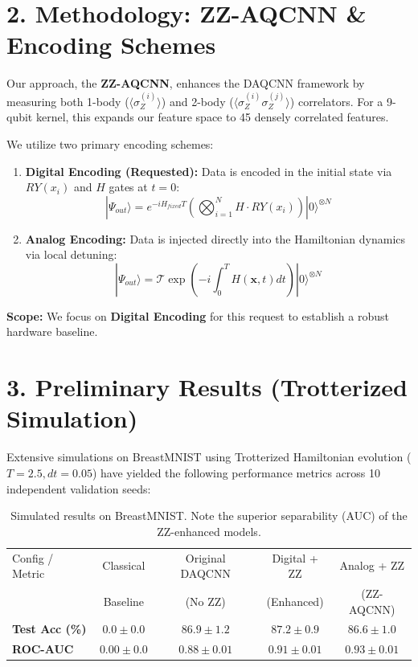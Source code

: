 \documentclass[11pt,a4paper]{article}
\begin{document}
\section*{2. Methodology: ZZ-AQCNN \& Encoding Schemes}
Our approach, the \textbf{ZZ-AQCNN}, enhances the DAQCNN framework by measuring both 1-body ($\langle \sigma_Z^{(i)} \rangle$) and 2-body ($\langle \sigma_Z^{(i)} \sigma_Z^{(j)} \rangle$) correlators. For a 9-qubit kernel, this expands our feature space to 45 densely correlated features. 

We utilize two primary encoding schemes:
\begin{enumerate}
    \item \textbf{Digital Encoding (Requested):} Data is encoded in the initial state via $RY(x_i)$ and $H$ gates at $t=0$:
    \begin{equation}
        |\Psi_{out}\rangle = e^{-i H_{fixed} T} \left( \bigotimes_{i=1}^N H \cdot RY(x_i) \right) |0\rangle^{\otimes N}
    \end{equation}
    
    \item \textbf{Analog Encoding:} Data is injected directly into the Hamiltonian dynamics via local detuning:
    \begin{equation}
        |\Psi_{out}\rangle = \mathcal{T} \exp \left( -i \int_0^T H(\mathbf{x}, t) dt \right) |0\rangle^{\otimes N}
    \end{equation}
\end{enumerate}
\textbf{Scope:} We focus on \textbf{Digital Encoding} for this request to establish a robust hardware baseline.

\section*{3. Preliminary Results (Trotterized Simulation)}
Extensive simulations on BreastMNIST using Trotterized Hamiltonian evolution ($T=2.5, dt=0.05$) have yielded the following performance metrics across 10 independent validation seeds:

\begin{table}[htbp]
    \centering
    \begin{tabular}{l c c c c}
        \toprule
        Config / Metric & Classical & Original DAQCNN & Digital + ZZ & Analog + ZZ \\
                        & Baseline & (No ZZ) \cite{daqcnn2024} & (Enhanced) & (ZZ-AQCNN) \\
        \midrule
        \textbf{Test Acc (\%)} & $0.0 \pm 0.0$ & $86.9 \pm 1.2$ & $87.2 \pm 0.9$ & $86.6 \pm 1.0$ \\
        \textbf{ROC-AUC}       & $0.00 \pm 0.0$ & $0.88 \pm 0.01$ & $0.91 \pm 0.01$ & $0.93 \pm 0.01$ \\
        \bottomrule
    \end{tabular}
    \caption{Simulated results on BreastMNIST. Note the superior separability (AUC) of the ZZ-enhanced models.}
\end{table}
\end{document}
